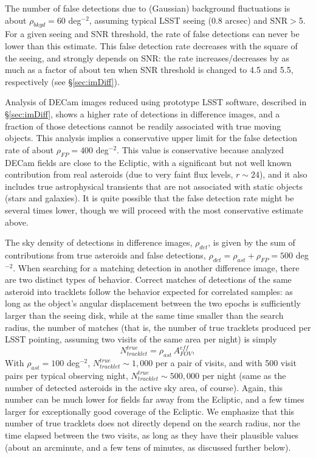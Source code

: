 The number of false detections due to (Gaussian) background fluctuations is
about $\rho_{bkgd} = 60$ deg$^{-2}$, assuming typical LSST seeing (0.8 arcsec)
and SNR$>$5. For a given seeing and SNR threshold, the rate of false detections can never be
lower than this estimate. This false detection rate decreases with the square of the seeing, and
strongly depends on SNR: the rate increases/decreases by as much as a factor of about ten
when SNR threshold is changed to 4.5 and 5.5, respectively (see \S\ref{sec:imDiff}).

Analysis of DECam images reduced using prototype LSST software, described in \S\ref{sec:imDiff},
shows a higher rate of detections in difference images, and a fraction of those detections
cannot be readily associated with true moving objects. This analysis implies a conservative
upper limit for the false detection rate of about $\rho_{FP} =  400$ deg$^{-2}$. This value
is conservative because analyzed DECam fields are close to the Ecliptic, with a significant but
not well known contribution from real asteroids (due to very faint flux levels, $r \sim 24$),
and it also includes true astrophysical transients that are not associated with static objects
(stars and galaxies). It is quite possible that the false detection rate might be several
times lower, though we will proceed with the most conservative estimate above.

The sky density of detections in difference images, $\rho_{det}$, is given by
the sum of contributions from true asteroids and false detections, $\rho_{det} = \rho_{ast} + \rho_{FP}
= 500$ deg$^{-2}$. When searching for a matching detection in another difference image, there are
two distinct types of behavior. Correct matches of detections of the same asteroid into tracklets follow the behavior
expected for correlated samples: as long as the object's angular displacement between the two epochs
is sufficiently larger than the seeing disk, while at the same time smaller than the search radius, the
number of matches (that is, the number of true tracklets produced per LSST pointing, assuming
two visits of the same area per night) is simply
\begin{equation}
                  N_{tracklet}^{true} = \rho_{ast}  \, A_{FOV}^{eff},
\end{equation}
With  $\rho_{ast} = 100$ deg$^{-2}$, $N_{tracklet}^{true} \sim 1,000$ per a pair of visits, and with
500 visit pairs per typical observing night, $N_{tracklet}^{true} \sim 500,000$ per night (same as
the number of detected asteroids in the active sky area, of course). Again,
this number can be much lower for fields far away from the Ecliptic, and a few times larger
for exceptionally good coverage of the Ecliptic. We emphasize that this number of true tracklets
does not directly depend on the search radius, nor the time elapsed between the two visits, as long
as they have their plausible values (about an arcminute, and a few tens of minutes, as discussed
further below).



